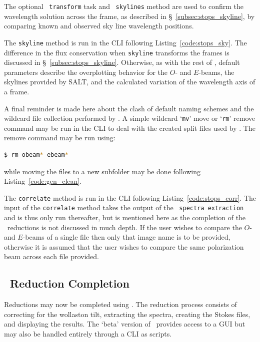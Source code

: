 The optional \iraf\ \texttt{transform} task and \stops\ \texttt{skylines} method are used to confirm the wavelength solution across the frame, as described in \S~\ref{subsec:stops_skyline}, by comparing known and observed sky line wavelength positions.

The \texttt{skyline} method is run in the \gls{CLI} following Listing~\ref{code:stops_sky}. The difference in the flux conservation when \texttt{skyline} transforms the frames is discussed in \S~\ref{subsec:stops_skyline}. Otherwise, as with the rest of \stops, default parameters describe the overplotting behavior for the $O$- and $E$-beams, the skylines provided by \gls{SALT}, and the calculated variation of the wavelength axis of a frame.

A final reminder is made here about the clash of default naming schemes and the wildcard file collection performed by \polsalt. A simple wildcard `\texttt{mv}' move or `\texttt{rm}' remove command may be run in the \gls{CLI} to deal with the created split files used by \iraf. The remove command may be run using:
\begin{lstlisting}[language=bash]
$ rm obeam* ebeam*
\end{lstlisting}
{\parskip=0pt
while moving the files to a new subfolder may be done following Listing~\ref{code:gen_clean}.
}

The \texttt{correlate} method is run in the \gls{CLI} following Listing~\ref{code:stops_corr}. The input of the \texttt{correlate} method takes the output of the \polsalt\ \texttt{spectra extraction} and is thus only run thereafter, but is mentioned here as the completion of the \polsalt\ reductions is not discussed in much depth. If the user wishes to compare the $O$- and $E$-beams of a single file then only that image name is to be provided, otherwise it is assumed that the user wishes to compare the same polarization beam across each file provided.

\subsection{\polsalt\ Reduction Completion} \label{subsec:reduc_com}

Reductions may now be completed using \polsalt. The reduction process consists of correcting for the wollaston tilt, extracting the spectra, creating the Stokes files, and displaying the results. The `beta' version of \polsalt\ provides access to a \gls{GUI} but may also be handled entirely through a \gls{CLI} as scripts.

